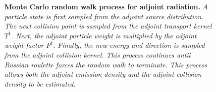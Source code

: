 \begin{figure}[t!]
  \begin{center}
    \end{center}
  \caption{\textbf{Monte Carlo random walk process for adjoint radiation.}
    \textit{A particle state is first sampled from the adjoint source 
      distribution. The next collision point is sampled from the adjoint 
      transport kernel $T^{\dagger}$. Next, the adjoint particle weight is
      multiplied by the adjoint weight factor $P^{\dagger}$. Finally, the new 
      energy and direction is sampled from the adjoint collision kernel. This
      process continues until Russian roulette forces the random walk to
      terminate. This process allows both the adjoint emission density and 
      the adjoint collision density to be estimated.}}
  \label{fig:combined_adj_random_walk_process}
\end{figure}

